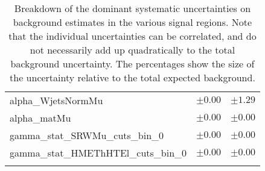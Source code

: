 \begin{table}
\begin{center}
\begin{tabular*}{\textwidth}{@{\extracolsep{\fill}}lcc}
alpha\_WjetsNormMu         & $\pm 0.00$          & $\pm 1.29$       \\
alpha\_matMu         & $\pm 0.00$          & $\pm 0.00$       \\
gamma\_stat\_SRWMu\_cuts\_bin\_0         & $\pm 0.00$          & $\pm 0.00$       \\
gamma\_stat\_HMEThHTEl\_cuts\_bin\_0         & $\pm 0.00$          & $\pm 0.00$       \\
\noalign{\smallskip}\hline\noalign{\smallskip}
\end{tabular*}
\end{center}
\caption[Breakdown of uncertainty on background estimates]{
Breakdown of the dominant systematic uncertainties on background estimates in the various signal regions.
Note that the individual uncertainties can be correlated, and do not necessarily add up quadratically to 
the total background uncertainty. The percentages show the size of the uncertainty relative to the total expected background.
\label{table.results.bkgestimate.uncertainties.HMThHTEl_HMThHTMu}}
\end{table}
%